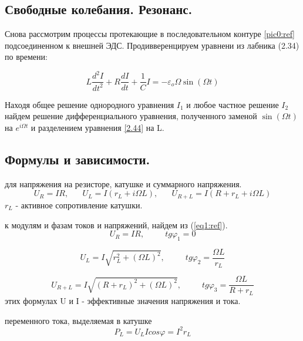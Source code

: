 \documentclass[a4paper,12pt]{article} %
\begin{document}
\subsection{Свободные колебания. Резонанс.}

Снова рассмотрим процессы протекающие в последовательном контуре \eqref{pic0:ref} подсоединенном к внешней ЭДС. Продивверенцируем уравнени из лабника (2.34) по времени:

\begin{equation}\label{2.44}
L \frac{d^2I}{dt^2} + R \frac{dI}{dt} + \frac{1} {C} I = -\varepsilon_o \Omega \sin(\Omega t)
\end{equation}

Находя общее решение однородного уравнения $I_1$ и любое частное решение $I_2$ найдем решение дифференциального уравнения, полученного заменой $\sin(\Omega t)$ на $e^{i \Omega t}$ и разделением уравнения \eqref{2.44} на L.

\subsection{Формулы и зависимости.}

 для напряжения на резисторе, катушке и суммарного напряжения.
\begin{equation}
U_R = IR,\;\;\;\;\;\;U_L = I(r_L + i\Omega L),\;\;\;\;\;\;U_{R+L} = I(R + r_L + i\Omega L)
\label{eq1:ref}
\end{equation}
 $r_L$ - активное сопротивление катушки.

 к модулям и фазам токов и напряжений, найдем из (\ref{eq1:ref}).
\begin{equation}
U_R = IR,\;\;\;\;\;\;\;\;\;tg\varphi_1 = 0
\label{eq2:ref}
\end{equation}

\begin{equation}
U_L = I\sqrt{r_L^2 + (\Omega L)^2},\;\;\;\;\;\;\;\;\;tg\varphi_2 = \frac{\Omega L}{r_L}
\label{eq3:ref}
\end{equation}

\begin{equation}
U_{R+L} = I\sqrt{(R + r_L)^2 + (\Omega L)^2},\;\;\;\;\;\;\;\;\;tg\varphi_3 = \frac{\Omega L}{R + r_L}
\label{eq4:ref}
\end{equation}
 этих формулах U и I - эффективные значения напряжения и тока.

 переменного тока, выделяемая в катушке
\begin{equation}
P_L = U_L I cos\varphi = I^2r_L
\label{eq5:ref}
\end{equation}
\end{document}
